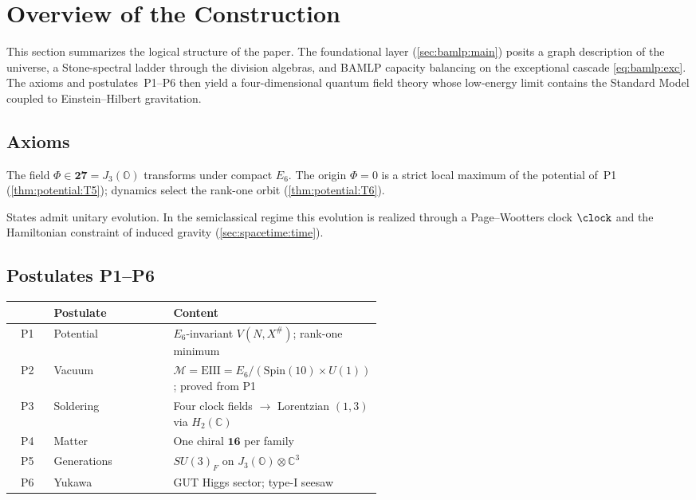 \section{Overview of the Construction}
\label{sec:master:chain}

This section summarizes the logical structure of the paper. The foundational
layer (\autoref{sec:bamlp:main}) posits a graph description of the universe,
a Stone-spectral ladder through the division algebras, and BAMLP capacity
balancing on the exceptional cascade
\eqref{eq:bamlp:exc}. The axioms and postulates~\textnormal{P1--P6} then yield a
four-dimensional quantum field theory whose low-energy limit contains the
Standard Model coupled to Einstein--Hilbert gravitation.

\subsection{Axioms}
\label{sec:master:axioms}

\begin{axiom}\label{ax:master:I}
The field $\Phi\in\mathbf{27}=J_3(\mathbb O)$ transforms under compact $E_6$.
The origin $\Phi=0$ is a strict local maximum of the potential of~\textnormal{P1}
(\autoref{thm:potential:T5}); dynamics select the rank-one orbit
(\autoref{thm:potential:T6}).
\end{axiom}

\begin{axiom}\label{ax:master:II}
States admit unitary evolution. In the semiclassical regime this evolution is
realized through a Page--Wootters clock $\clock$ and the Hamiltonian constraint
of induced gravity (\autoref{sec:spacetime:time}).
\end{axiom}

\subsection{Postulates \textnormal{P1--P6}}
\label{sec:master:postulates}

\begin{center}
\small
\begin{tabular}{@{}clp{0.54\linewidth}@{}}
\toprule
 & Postulate & Content \\
\midrule
P1 & Potential & $E_6$-invariant $V(N,X^\#)$; rank-one minimum \\
P2 & Vacuum & $\mathcal M=\mathrm{EIII}=E_6/(\mathrm{Spin}(10)\times U(1))$;
proved from P1 \\
P3 & Soldering & Four clock fields $\to$ Lorentzian $(1,3)$ via $H_2(\mathbb C)$ \\
P4 & Matter & One chiral $\mathbf{16}$ per family \\
P5 & Generations & $SU(3)_F$ on $J_3(\mathbb O)\otimes\mathbb C^3$ \\
P6 & Yukawa & GUT Higgs sector; type-I seesaw \\
\bottomrule
\end{tabular}
\end{center}


